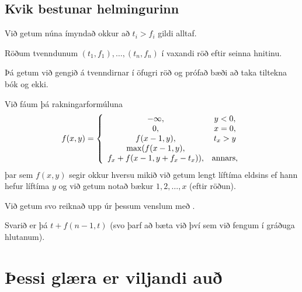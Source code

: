 \subsection{Kvik bestunar helmingurinn}
{
	{
		\item<1-> Við getum núna ímyndað okkur að $t_i > f_i$ gildi alltaf.
		\item<2-> Röðum tvenndunum $(t_1, f_1), \dots, (t_n, f_n)$ í vaxandi röð eftir seinna hnitinu.
		\item<3-> Þá getum við gengið á tvenndirnar í öfugri röð og prófað bæði að taka tiltekna bók og ekki.
		\item<4-> Við fáum þá rakningarformúluna
\[
	f(x, y)
	=
	\left \{
	\begin{array}{c c}
		-\infty, & y < 0,\\
		0, & x = 0,\\
		f(x - 1, y), & t_x > y\\
		\max(f(x - 1, y), &\\
			f_x + f(x - 1, y + f_x - t_x)), & \text{annars,}
	\end{array}
	\right .
\]
					þar sem $f(x, y)$ segir okkur hversu mikið við getum lengt líftíma eldsins ef hann hefur líftíma $y$ og 
						við getum notað bækur $1, 2, \dots, x$ (eftir röðun).
		\item<5-> Við getum svo reiknað upp úr þessum venslum með \onslide<6->{kvikri bestun}.
		\item<7-> Svarið er þá $t + f(n - 1, t)$ (svo þarf að bæta við því sem við fengum í gráðuga hlutanum).
	}
}

\section{Þessi glæra er viljandi auð}
{
}


